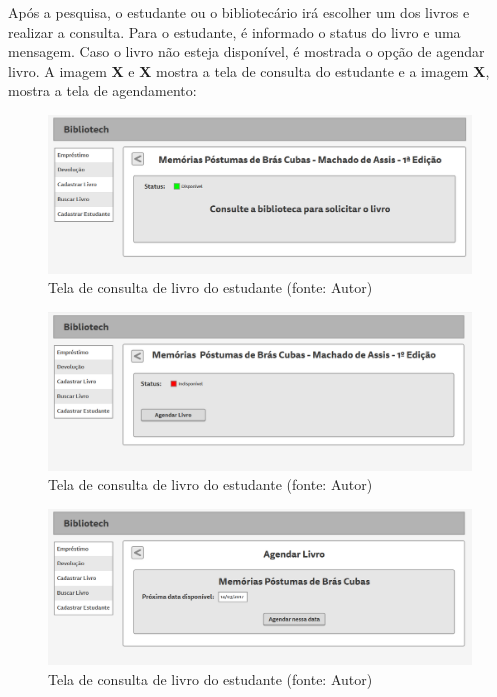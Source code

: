 Após a pesquisa, o estudante ou o bibliotecário irá escolher um dos livros e realizar a consulta. Para o estudante, é informado o status do livro e uma mensagem. Caso o livro não esteja disponível, é mostrada o opção de  agendar livro. A imagem \textbf{X} e \textbf{X} mostra a tela de consulta do estudante e a imagem \textbf{X}, mostra a tela de agendamento:

\begin{figure}[!h]
\centering
\includegraphics[scale=0.40, angle = 360]{figuras/prototipo6}
\caption[]{Tela de consulta de livro do estudante (fonte: Autor)}
\end{figure}
\FloatBarrier

\begin{figure}[!h]
\centering
\includegraphics[scale=0.40, angle = 360]{figuras/prototipo7}
\caption[]{Tela de consulta de livro do estudante (fonte: Autor)}
\end{figure}
\FloatBarrier

\begin{figure}[!h]
\centering
\includegraphics[scale=0.40, angle = 360]{figuras/prototipo8}
\caption[]{Tela de consulta de livro do estudante (fonte: Autor)}
\end{figure}
\FloatBarrier

